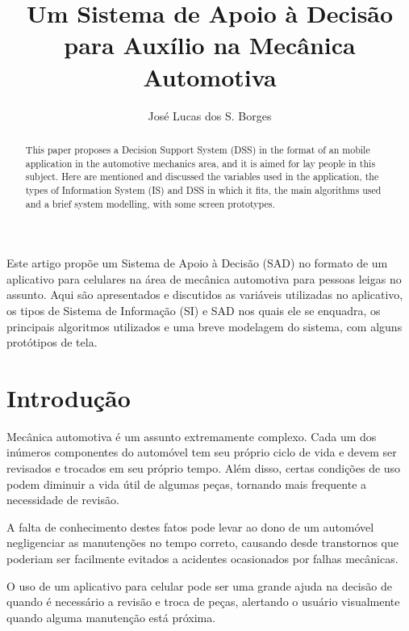 \documentclass[12pt]{article}
\title{Um Sistema de Apoio à Decisão para Auxílio na Mecânica Automotiva}
\author{José Lucas dos S. Borges{\inst1}}
\begin{document}
\maketitle

\begin{abstract}
    This paper proposes a Decision Support System (DSS) in the format of an
    mobile application in the automotive mechanics area, and it is aimed for
    lay people in this subject. Here are mentioned and discussed the variables
    used in the application, the types of Information System (IS) and DSS in
    which it fits, the main algorithms used and a brief system modelling, with
    some screen prototypes.
\end{abstract}

\begin{resumo}
    Este artigo propõe um Sistema de Apoio à Decisão (SAD) no formato de um
    aplicativo para celulares na área de mecânica automotiva para pessoas leigas
    no assunto. Aqui são apresentados e discutidos as variáveis utilizadas no
    aplicativo, os tipos de Sistema de Informação (SI) e SAD nos quais ele se
    enquadra, os principais algoritmos utilizados e uma breve modelagem do
    sistema, com alguns protótipos de tela.
\end{resumo}


\section{Introdução} \label{sec:introducao}

Mecânica automotiva é um assunto extremamente complexo. Cada um dos inúmeros
componentes do automóvel tem seu próprio ciclo de vida e devem ser revisados
e trocados em seu próprio tempo. Além disso, certas condições de uso podem
diminuir a vida útil de algumas peças, tornando mais frequente a necessidade
de revisão.

A falta de conhecimento destes fatos pode levar ao dono de um automóvel
negligenciar as manutenções no tempo correto, causando desde transtornos
que poderiam ser facilmente evitados a acidentes ocasionados por falhas
mecânicas.

O uso de um aplicativo para celular pode ser uma grande ajuda na decisão de
quando é necessário a revisão e troca de peças, alertando o usuário
visualmente quando alguma manutenção está próxima.

\end{document}
